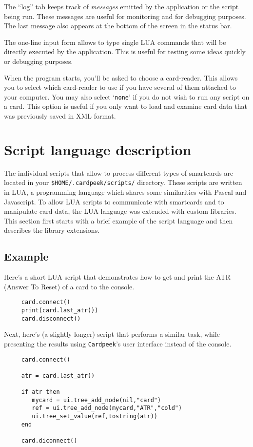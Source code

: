 \documentclass[11pt]{article}
\begin{document}
The ``log'' tab keeps track of \emph{messages} emitted by the application or the script being run.
These messages are useful for monitoring and for debugging purposes. 
The last message also appears at the bottom of the screen in the status bar.

The one-line input form allows to type single LUA commands that will be directly executed by the application.
This is useful for testing some ideas quickly or debugging purposes.

When the program starts, you'll be asked to choose a card-reader.
This allows you to select which card-reader to use if you have several of them attached to your computer.
You may also select `\texttt{none}' if you do not wish to run any script on a card. This option is useful if you
only want to load and examine card data that was previously saved in XML format.

\section{Script language description}

The individual scripts that allow to process different types of smartcards are located in your \texttt{\$HOME/.cardpeek/scripts/} directory.
These scripts are written in LUA, a programming language which shares some similarities with Pascal and Javascript.
To allow LUA scripts to communicate with smartcards and to manipulate card data, the LUA language was extended with custom libraries.
This section first starts with a brief example of the script language and then describes the library extensions.

\subsection{Example}

Here's a short LUA script that demonstrates how to get and print the ATR (Answer To Reset) of a card to the console.
\begin{verbatim}
     card.connect()
     print(card.last_atr())
     card.disconnect()
\end{verbatim}

Next, here's (a slightly longer) script that performs a similar task, while presenting the results using \texttt{Cardpeek}'s user interface instead of the console. 

\begin{verbatim}
     card.connect()

     atr = card.last_atr()

     if atr then
        mycard = ui.tree_add_node(nil,"card")
        ref = ui.tree_add_node(mycard,"ATR","cold")
        ui.tree_set_value(ref,tostring(atr))
     end

     card.diconnect()
\end{verbatim}
\end{document}
